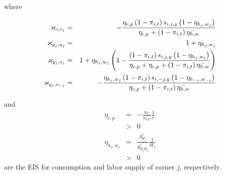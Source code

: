 \documentclass[notes=show]{beamer}
\begin{document}
\begin{frame}%



where

\begin{eqnarray}
\varkappa _{c,v_{j}} &=&-\frac{\eta _{c,p}\left( 1-\pi _{i,t}\right)
s_{i,j,y}\left( 1-\eta _{h_{j},w_{j}}\right) }{\eta _{c,p}+\left( 1-\pi
_{i,t}\right) \overset{\_}{\eta _{h,w}}} \\
\varkappa _{y_{j},u_{j}} &=&1+\eta _{h_{j},w_{j}}  \notag \\
\varkappa _{y_{j},v_{j}} &=&1+\eta _{h_{j},w_{j}}\left( 1-\frac{\left( 1-\pi
_{i,t}\right) s_{i,j,y}\left( 1-\eta _{h_{j},w_{j}}\right) }{\eta
_{c,p}+\eta _{c,p}+\left( 1-\pi _{i,t}\right) \overset{\_}{\eta _{h,w}}}%
\right)  \notag \\
\varkappa _{y_{j},v_{-j}} &=&-\frac{\eta _{h_{j},w_{j}}\left( 1-\pi
_{i,t}\right) s_{i,-j,y}\left( 1-\eta _{h_{-j},w_{-j}}\right) }{\eta
_{c,p}+\left( 1-\pi _{i,t}\right) \overset{\_}{\eta _{h,w}}}  \notag
\end{eqnarray}

\transboxout%
\end{frame}%

\bigskip

\begin{frame}%



and 
\begin{eqnarray*}
\eta _{c,p} &=&-\frac{u_{C}}{u_{CC}}\frac{1}{c} \\
&>&0 \\
\eta _{h_{j},w_{j}} &=&\frac{g_{H_{j}}^{j}}{g_{H_{j}H_{j}}^{j}}\frac{1}{H_{j}%
} \\
&>&0
\end{eqnarray*}%
are the EIS for consumption and labor supply of earner $j$, respectively.

\transboxout%
\end{frame}%
\end{document}
